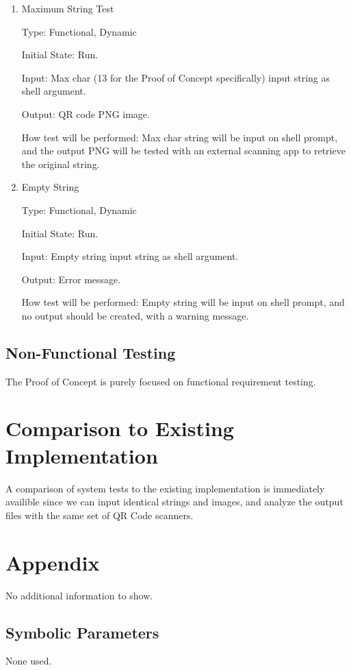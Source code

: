 \documentclass[12pt, titlepage]{article}
\begin{document}
\begin{enumerate}

\item{Maximum String Test\\}

Type: Functional, Dynamic
					
Initial State: Run.
					
Input: Max char (13 for the Proof of Concept specifically) input string as shell argument.
					
Output: QR code PNG image.
					
How test will be performed: Max char string will be input on shell prompt, and the output PNG will be tested with an external scanning app to retrieve the original string.
					
\item{Empty String\\}

Type: Functional, Dynamic
					
Initial State: Run.
					
Input: Empty string input string as shell argument.
					
Output: Error message.
					
How test will be performed: Empty string will be input on shell prompt, and no output should be created, with a warning message.

\end{enumerate}

\subsection{Non-Functional Testing}

The Proof of Concept is purely focused on functional requirement testing.
	
\section{Comparison to Existing Implementation}	

A comparison of system tests to the existing implementation is immediately availible since we can input identical strings and images, and analyze the output files with the same set of QR Code scanners.





\newpage

\section{Appendix}

No additional information to show.

\subsection{Symbolic Parameters}

None used.
\end{document}
